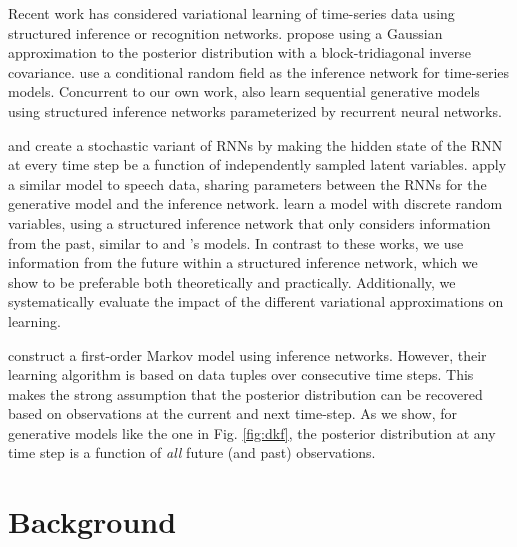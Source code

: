 \documentclass[letterpaper]{article}
\theoremstyle{plain}
\begin{document}
Recent work has considered variational learning of time-series
data using structured inference or recognition networks.
\citeauthor{archer2015black} propose using a
Gaussian approximation to the posterior distribution with a block-tridiagonal inverse covariance. 
\citeauthor{johnson2016structured} use a conditional random field as the inference network for time-series models. 
Concurrent to our own work, \citeauthor{fraccaro2016sequential} also learn sequential generative models 
using structured inference networks parameterized by recurrent neural networks.

\citeauthor{bayer2014learning} and \citeauthor{fabius2014variational} create a stochastic variant of RNNs 
by making the hidden state of the RNN at every time step be a function
of independently sampled latent variables. \citeauthor{chung2015recurrent}
apply a similar model to speech data, sharing parameters between the
RNNs for the generative model and the inference network.
\citeauthor{gan2015deep} learn a 
model with discrete random variables, using a structured inference network that only considers information from the 
past, similar to \citeauthor{chung2015recurrent} and \citeauthor{gregor2015draw}'s models. 
In contrast to these works, we use information from the future within a
structured inference network, which we show to be preferable both
theoretically and practically. Additionally, we systematically
evaluate the impact of the different variational approximations on
learning. 

\citeauthor{watter2015embed} construct a first-order Markov model using inference networks. However, their learning
algorithm is based on data tuples over consecutive time steps. This makes the strong assumption
that the posterior distribution can be recovered based on observations
at the current and next time-step.
As we show, for generative models like the one in Fig. \ref{fig:dkf}, the 
posterior distribution at any time step is a function of \emph{all}
future (and past) observations. 
 \section{Background}\label{sec:back}
\end{document}
